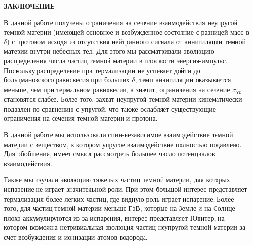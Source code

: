 \clearpage
\newpage
\begin{center}
	\textbf{\large ЗАКЛЮЧЕНИЕ}
\end{center}


В данной работе получены ограничения на сечение взаимодействия неупругой темной материи (имеющей основное и возбужденное состояние с разницей масс в $\delta$) с протоном исходя из отсутствия нейтринного сигнала от аннигиляции темной материи внутри небесных тел.
Для этого мы рассматривали эволюцию распределения числа частиц темной материи в плоскости энергия-импульс. Поскольку распределение при термализации не успевает дойти до больцмановского равновесия при больших $\delta$, темп аннигиляции оказывается меньше, чем при термальном равновесии, а значит, ограничения на сечение $\sigma_{\chi p}$  становятся слабее. Более того, захват неупругой темной материи кинематически подавлен по сравнению с упругой, что также ослабляет существующие ограничения на сечения темной материи и протона.

В данной работе мы использовали спин-независимое взаимодействие темной материи с веществом, в котором упругое взаимодействие полностью подавлено. Для обобщения, имеет смысл рассмотреть большее число потенциалов взаимодействия.

Также мы изучали эволюцию тяжелых частиц темной материи, для которых испарение не играет значительной роли. При этом большой интерес представляет термализация более легких частиц, где видную роль играет испарение. Более того, для частиц темной материи меньше ГэВ, которые на Земле и на Солнце плохо аккумулируются из-за испарения, интерес представляет Юпитер, на котором возможна нетривиальная эволюция частиц неупругой темной материи за счет возбуждения и ионизации атомов водорода.
